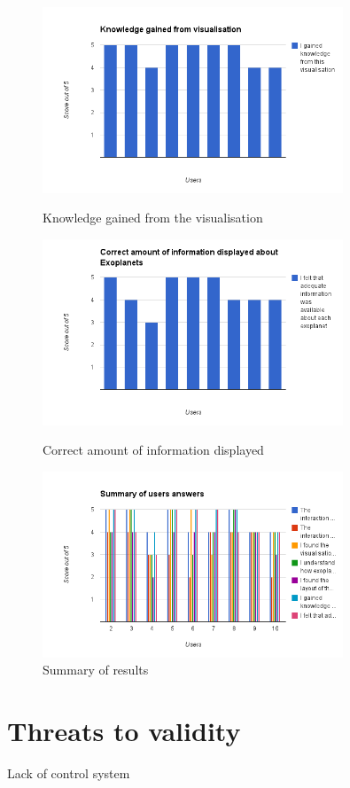 \begin{figure}[H]
  \centering
      \includegraphics[width=0.8\textwidth]{images/charts/chart_7.png}
  \caption{Knowledge gained from the visualisation}  
    \label{fig:chart7}

      \includegraphics[width=0.8\textwidth]{images/charts/chart_8.png}
  \caption{Correct amount of information displayed}  
    \label{fig:chart8}
      \includegraphics[width=0.8\textwidth]{images/charts/chart_9.png}
  \caption{Summary of results}  
    \label{fig:chart9}
    
\end{figure}
\section{Threats to validity}
Lack of control system

